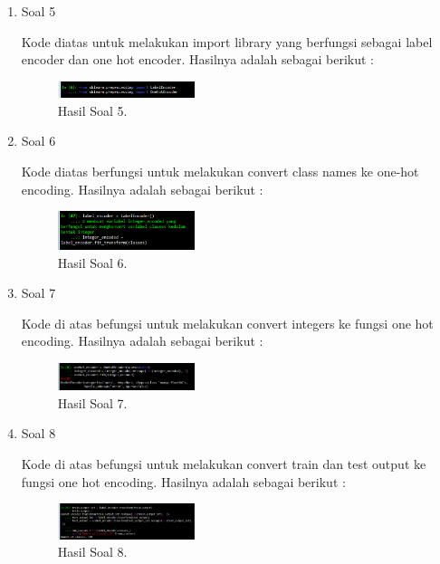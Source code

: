 \begin{enumerate}
	\item Soal 5
	\hfill\break
	
	Kode diatas untuk melakukan import library yang berfungsi sebagai label encoder dan one hot encoder. Hasilnya adalah sebagai berikut :
	\begin{figure}[H]
	\centering
		\includegraphics[width=4cm]{figures/1174080/7/materi/hasil5.PNG}
		\caption{Hasil Soal 5.}
	\end{figure}

	\item Soal 6
	\hfill\break
	
	Kode diatas berfungsi untuk melakukan convert class names ke one-hot encoding. Hasilnya adalah sebagai berikut :
	\begin{figure}[H]
	\centering
		\includegraphics[width=4cm]{figures/1174080/7/materi/hasil6.PNG}
		\caption{Hasil Soal 6.}
	\end{figure}

	\item Soal 7
	\hfill\break
	
	Kode di atas befungsi untuk melakukan convert integers ke fungsi one hot encoding. Hasilnya adalah sebagai berikut :
	\begin{figure}[H]
	\centering
		\includegraphics[width=4cm]{figures/1174080/7/materi/hasil7.PNG}
		\caption{Hasil Soal 7.}
	\end{figure}

	\item Soal 8
	\hfill\break
	
	Kode di atas befungsi untuk melakukan convert train dan test output ke fungsi one hot encoding. Hasilnya adalah sebagai berikut :
	\begin{figure}[H]
	\centering
		\includegraphics[width=4cm]{figures/1174080/7/materi/hasil8.PNG}
		\caption{Hasil Soal 8.}
	\end{figure}


\end{enumerate}
